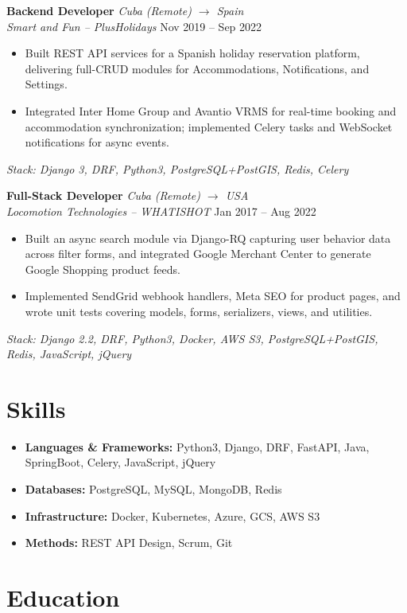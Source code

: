 \documentclass[10pt, letterpaper]{article}
\newcommand{\jobtitle}[4]{%
    \textbf{#1} \hfill \textit{#2}\\[-1pt]%
    \textit{#3} \hfill #4%
}
\newcommand{\jobstack}[1]{\vspace{0pt}\textit{\small Stack: #1}}
\newcommand{\entrysep}{\vspace{4pt}}
\begin{document}
\entrysep

\jobtitle{Backend Developer}{Cuba (Remote) $\to$ Spain}{Smart and Fun -- PlusHolidays}{Nov 2019 -- Sep 2022}
\begin{itemize}
    \item Built REST API services for a Spanish holiday reservation platform, delivering full-CRUD
          modules for Accommodations, Notifications, and Settings.
    \item Integrated Inter Home Group and Avantio VRMS for real-time booking and accommodation
          synchronization; implemented Celery tasks and WebSocket notifications for async events.
\end{itemize}
\jobstack{Django 3, DRF, Python3, PostgreSQL+PostGIS, Redis, Celery}

\entrysep

\jobtitle{Full-Stack Developer}{Cuba (Remote) $\to$ USA}{Locomotion Technologies -- WHATISHOT}{Jan 2017 -- Aug 2022}
\begin{itemize}
    \item Built an async search module via Django-RQ capturing user behavior data across filter
          forms, and integrated Google Merchant Center to generate Google Shopping product feeds.
    \item Implemented SendGrid webhook handlers, Meta SEO for product pages, and wrote unit tests
          covering models, forms, serializers, views, and utilities.
\end{itemize}
\jobstack{Django 2.2, DRF, Python3, Docker, AWS S3, PostgreSQL+PostGIS, Redis, JavaScript, jQuery}

\section{Skills}

\begin{itemize}
    \item \textbf{Languages \& Frameworks:} Python3, Django, DRF, FastAPI, Java, SpringBoot, Celery, JavaScript, jQuery
    \item \textbf{Databases:} PostgreSQL, MySQL, MongoDB, Redis
    \item \textbf{Infrastructure:} Docker, Kubernetes, Azure, GCS, AWS S3
    \item \textbf{Methods:} REST API Design, Scrum, Git
\end{itemize}

\section{Education}
\end{document}
